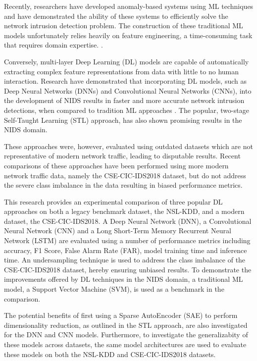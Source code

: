 \documentclass[conference]{IEEEtran}
\begin{document}
Recently, researchers have developed anomaly-based systems using ML techniques and have demonstrated the ability of these systems to efficiently solve the network intrusion detection problem\cite{b8}. The construction of these traditional ML models unfortunately relies heavily on feature engineering, a time-consuming task that requires domain expertise. \cite{b9}. 

Conversely, multi-layer Deep Learning (DL) models are capable of automatically extracting complex feature representations from data with little to no human interaction\cite{b10}. Research have demonstrated that
incorporating DL models, such as Deep Neural Networks (DNNs) and Convolutional Neural Networks (CNNs), into the development of NIDS results in faster and more accurate network intrusion detections, when compared to tradition ML approaches \cite{vin_make_poo, xiao}. The popular, two-stage Self-Taught Learning (STL) approach, has also shown promising results in the NIDS domain\cite{b2}. 

These approaches were, however, evaluated using outdated datasets which are not representative of modern network traffic, leading to disputable results. Recent comparisons of these approaches have been performed using more modern network traffic data, namely the CSE-CIC-IDS2018 dataset, but do not address the severe class imbalance in the data resulting in biased performance metrics. 

This research provides an experimental comparison of three popular DL approaches on both a legacy benchmark dataset, the NSL-KDD, and a modern dataset, the CSE-CIC-IDS2018. A Deep Neural Network (DNN), a Convolutional Neural Network (CNN) and a Long Short-Term Memory Recurrent Neural Network (LSTM) are evaluated using a number of performance metrics including accuracy, F1 Score, False Alarm Rate (FAR), model training time and inference time. An undersampling technique is used to address the class imbalance of the CSE-CIC-IDS2018 dataset, hereby ensuring unbiased results. To demonstrate the improvements offered by DL techniques in the NIDS domain, a traditional ML model, a Support Vector Machine (SVM),  is used as a benchmark in the comparison. 

The potential benefits of first using a Sparse AutoEncoder (SAE) to perform dimensionality reduction, as outlined in the STL approach, are also investigated for the DNN and CNN models. Furthermore, to investigate the generalizabity of these models across datasets, the same model architectures are used to evaluate these models on both the NSL-KDD and CSE-CIC-IDS2018 datasets. 
\end{document}
